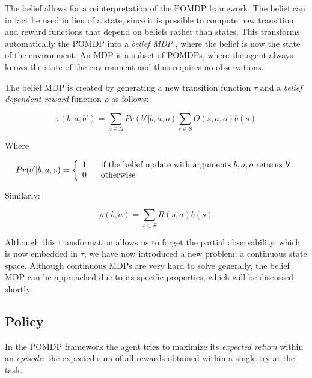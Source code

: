 The belief allows for a reinterpretation of the POMDP framework. The belief can in fact be used in
lieu of a state, since it is possible to compute new transition and reward functions that depend on
beliefs rather than states. This transforms automatically the POMDP into a \textit{belief MDP}
\cite{cit:pomdp}, where the belief is now the state of the environment. An MDP
\cite{cit:suttonbarto} is a subset of POMDPs, where the agent always knows the state of the
environment and thus requires no observations.

The belief MDP is created by generating a new transition function $\tau$ and a \textit{belief
dependent reward} function $\rho$ as follows:

\begin{equation}
 \tau(b,a,b') = \sum_{o\in \Omega} Pr(b' | b, a, o) \sum_{s\in S} O(s,a,o) b(s)
\end{equation}

Where

\begin{equation}
Pr(b' | b, a, o) = \left\{
  \begin{array}{lr}
    1 \hspace{.6cm}\text{if the belief update with arguments $b,a,o$ returns $b'$}\\
    0 \hspace{.6cm}\text{otherwise}
  \end{array}
\right.
\end{equation}

Similarly:

\begin{equation}
 \rho(b,a) = \sum_{s\in S} R(s,a) b(s)
 \label{rhoeq}
\end{equation}

Although this transformation allows us to forget the partial observability, which is now embedded in
$\tau$, we have now introduced a new problem: a continuous state space. Although continuous MDPs are
very hard to solve generally, the belief MDP can be approached due to its specific properties, which
will be discussed shortly.

\subsection{Policy}

In the POMDP framework the agent tries to maximize its \textit{expected return} within an
\textit{episode}: the expected sum of all rewards obtained within a single try at the task.

